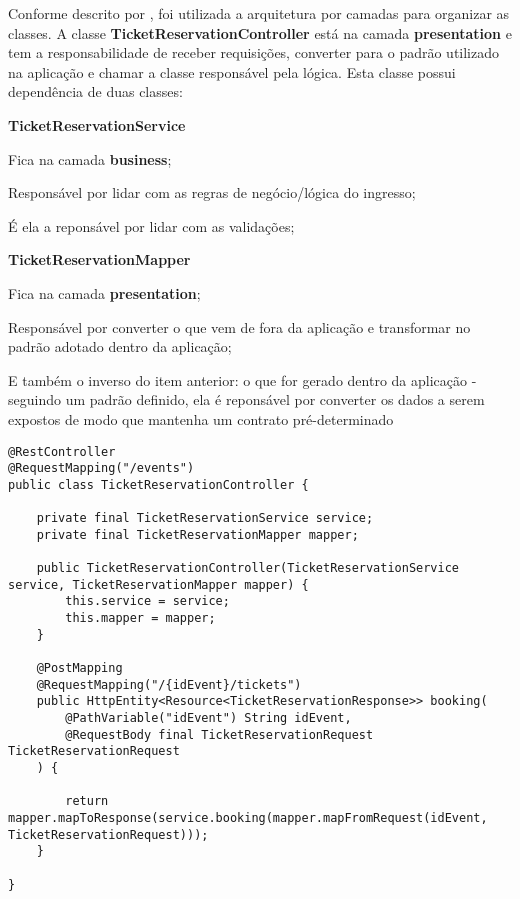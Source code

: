 Conforme descrito por \cite{mark-richards-software-architecture-patterns},
foi utilizada a arquitetura por camadas para organizar as classes.
A classe \textbf{TicketReservationController} está na camada \textbf{presentation} e tem a
responsabilidade de receber requisições, converter para o padrão utilizado na
aplicação e chamar a classe responsável pela lógica.
Esta classe possui dependência de duas classes:

\begin{alineas}

  \item \textbf{TicketReservationService}

  \begin{alineas}
     \item Fica na camada \textbf{business};
     \item Responsável por lidar com as regras de negócio/lógica do ingresso;
     \item É ela a reponsável por lidar com as validações;
  \end{alineas}

  \item \textbf{TicketReservationMapper}

  \begin{alineas}
     \item Fica na camada \textbf{presentation};
     \item Responsável por converter o que vem de fora da aplicação e transformar
           no padrão adotado dentro da aplicação;
     \item E também o inverso do item anterior: o que for gerado dentro da aplicação -
           seguindo um padrão definido, ela é reponsável por converter
           os dados a serem expostos de modo que mantenha um contrato pré-determinado
  \end{alineas}

\end{alineas}

\begin{lstlisting}[label=classe-ticket-reservation-reservation-controller,caption=Classe TicketReservationController em Java]
@RestController
@RequestMapping("/events")
public class TicketReservationController {

    private final TicketReservationService service;
    private final TicketReservationMapper mapper;

    public TicketReservationController(TicketReservationService service, TicketReservationMapper mapper) {
        this.service = service;
        this.mapper = mapper;
    }

    @PostMapping
    @RequestMapping("/{idEvent}/tickets")
    public HttpEntity<Resource<TicketReservationResponse>> booking(
        @PathVariable("idEvent") String idEvent,
        @RequestBody final TicketReservationRequest TicketReservationRequest
    ) {

        return mapper.mapToResponse(service.booking(mapper.mapFromRequest(idEvent, TicketReservationRequest)));
    }

}
\end{lstlisting}

